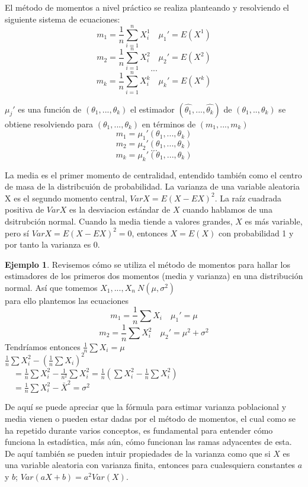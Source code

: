 \documentclass[11pt,a4paper,oneside]{report}
\theoremstyle{definition}
\newtheorem{ejemplo}[definicion]{Ejemplo}
\theoremstyle{plain}
\theoremstyle{remark}
\begin{document}
El método de momentos a nivel práctico se realiza planteando y resolviendo el siguiente sistema de ecuaciones:
\[m_1=\frac{1}{n} \sum_{i=1}^{n} X_{i}^{1} \quad \mu_1' =E(X^1) \]
\[m_2=\frac{1}{n} \sum_{i=1}^{n} X_{i}^{2} \quad \mu_2' =E(X^2) \]
\[...\]
\[m_k=\frac{1}{n} \sum_{i=1}^{n} X_{i}^{k} \quad \mu_k' =E(X^k) \]

$\mu_j'$ es una función de $(\theta_1,...,\theta_k)$ el estimador $(\hat{\theta_1},...,\hat{\theta_k})$
de $(\theta_1,..,\theta_k)$ se obtiene resolviendo para $(\theta_1,...,\theta_k)$ en términos de $(m_1,...,m_k)$
\[ m_1=\mu_1'(\theta_1,...,\theta_k) \]
\[ m_2=\mu_2'(\theta_1,...,\theta_k) \]
\[...\] 
\[ m_k=\mu_k'(\theta_1,...,\theta_k) \]

La media es el primer momento de centralidad, entendido también como el centro de masa de la distribcuión de probabilidad.
La varianza de una variable aleatoria X es el segundo momento central, $VarX=E(X-EX)^2$. 
La raíz cuadrada positiva de $VarX$ es la desviacion estándar de $X$ cuando hablamos de una dsitrubción normal.
Cuando la media tiende a valores grandes, $X$ es más variable, pero sí $VarX=E(X-EX)^2=0$,
entonces $X=E(X)$ con probabilidad 1 y por tanto la varianza es 0.

\begin{ejemplo}
  Revisemos cómo se utiliza el método de momentos para hallar los estimadores de los primeros dos momentos (media y varianza) 
  en una distribución normal. Así que tomemos $X_1,...,X_n~N(\mu,\sigma^{2})$\\
  para ello plantemos las ecuaciones 
  \[m_1=\frac{1}{n}\sum X_i \quad \mu_1'=\mu\]
  \[m_2=\frac{1}{n}\sum X_i^2 \quad \mu_2'=\mu^2+\sigma^2\]
  Tendríamos entonces $\frac{1}{n}\sum X_i= \mu$\\
  $\frac{1}{n}\sum X_i^2-(\frac{1}{n}\sum X_i)^2$\\
  $\quad = \frac{1}{n}\sum X_i^2-\frac{1}{n^2}\sum X_i^2=\frac{1}{n}(\sum X_i^2-\frac{1}{n}\sum X_i^2)$\\
  $\quad = \frac{1}{n}\sum X_i^2-\bar{X}^2=\sigma^2$
\end{ejemplo}
De aquí se puede apreciar que la fórmula para estimar varianza poblacional y media vienen o pueden estar dadas por el 
método de momentos, el cual como se ha repetido durante varios conceptos, es fundamental para entender cómo funciona la 
estadística, más aún, cómo funcionan las ramas adyacentes de esta. De aquí también se pueden intuir propiedades de la varianza
como que si $X$ es una variable aleatoria con varianza finita, entonces para cualesquiera constantes $a$ y $b$; $Var(aX+b)=a^{2}Var(X)$.\\
\end{document}
